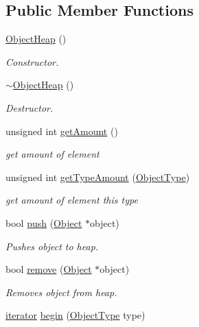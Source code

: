 \subsection*{Public Member Functions}
\begin{DoxyCompactItemize}
\item 
\hyperlink{classObjectHeap_a04488dc0dacc31b8f7f08c20716d447b}{Object\-Heap} ()
\begin{DoxyCompactList}\small\item\em Constructor. \end{DoxyCompactList}\item 
\hyperlink{classObjectHeap_a601b8bace5f8e425c90cc018b083b751}{$\sim$\-Object\-Heap} ()
\begin{DoxyCompactList}\small\item\em Destructor. \end{DoxyCompactList}\item 
unsigned int \hyperlink{classObjectHeap_a5320eb7e37dd7bfa968935b61d9f00bd}{get\-Amount} ()
\begin{DoxyCompactList}\small\item\em get amount of element \end{DoxyCompactList}\item 
unsigned int \hyperlink{classObjectHeap_aa864246aff54535535bffa4a779f6d8a}{get\-Type\-Amount} (\hyperlink{BasicTypes_8h_a842c5e2e69277690b064bf363c017980}{Object\-Type})
\begin{DoxyCompactList}\small\item\em get amount of element this type \end{DoxyCompactList}\item 
bool \hyperlink{classObjectHeap_a31aed12bfcff1455f1682cdb816184a6}{push} (\hyperlink{classObject}{Object} $\ast$object)
\begin{DoxyCompactList}\small\item\em Pushes object to heap. \end{DoxyCompactList}\item 
bool \hyperlink{classObjectHeap_a7092926b107145c62f0a6c8bd8ff1028}{remove} (\hyperlink{classObject}{Object} $\ast$object)
\begin{DoxyCompactList}\small\item\em Removes object from heap. \end{DoxyCompactList}\item 
\hyperlink{classObjectHeap_a5be9fee885fae47d7dc090899d9fb7bd}{iterator} \hyperlink{classObjectHeap_a3fa3502f08c4016bbcfcf8578e245d15}{begin} (\hyperlink{BasicTypes_8h_a842c5e2e69277690b064bf363c017980}{Object\-Type} type)

\end{DoxyCompactItemize}
